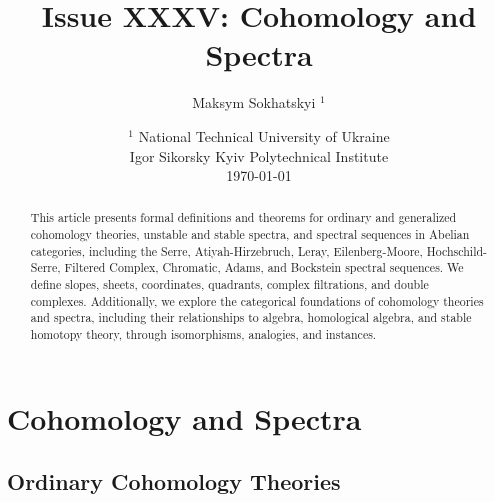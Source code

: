 \documentclass{article}
\begin{document}
\title{Issue XXXV: Cohomology and Spectra}
\author{Maksym Sokhatskyi $^1$}
\date{ $^1$ National Technical University of Ukraine \\
       \small Igor Sikorsky Kyiv Polytechnical Institute \\
       \today }

\maketitle

\begin{abstract}
This article presents formal definitions and theorems for ordinary and
generalized cohomology theories, unstable and stable spectra,
and spectral sequences in Abelian categories, including the Serre,
Atiyah-Hirzebruch, Leray, Eilenberg-Moore, Hochschild-Serre,
Filtered Complex, Chromatic, Adams, and Bockstein spectral sequences.
We define slopes, sheets, coordinates, quadrants, complex filtrations,
and double complexes. Additionally, we explore the categorical foundations
of cohomology theories and spectra, including their relationships to algebra,
homological algebra, and stable homotopy theory, through isomorphisms,
 analogies, and instances.
\end{abstract}

\ifincludeTOC
\tableofcontents
\fi

\newpage
\section{Cohomology and Spectra}

\subsection{Ordinary Cohomology Theories}
\end{document}
